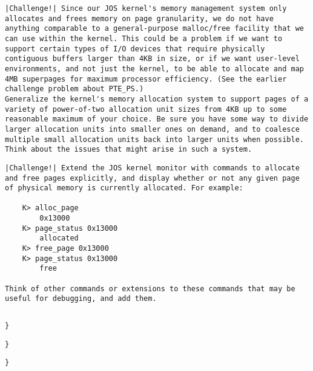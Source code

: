 \documentclass{article}
\begin{document}
\begin{CJK*}{UTF8}{gkai}
\begin{lstlisting}[style=challenge]
|Challenge!| Since our JOS kernel's memory management system only allocates and frees memory on page granularity, we do not have anything comparable to a general-purpose malloc/free facility that we can use within the kernel. This could be a problem if we want to support certain types of I/O devices that require physically contiguous buffers larger than 4KB in size, or if we want user-level environments, and not just the kernel, to be able to allocate and map 4MB superpages for maximum processor efficiency. (See the earlier challenge problem about PTE_PS.)
Generalize the kernel's memory allocation system to support pages of a variety of power-of-two allocation unit sizes from 4KB up to some reasonable maximum of your choice. Be sure you have some way to divide larger allocation units into smaller ones on demand, and to coalesce multiple small allocation units back into larger units when possible. Think about the issues that might arise in such a system.
\end{lstlisting}

\begin{lstlisting}[style=challenge]
|Challenge!| Extend the JOS kernel monitor with commands to allocate and free pages explicitly, and display whether or not any given page of physical memory is currently allocated. For example:

	K> alloc_page
		0x13000
	K> page_status 0x13000
		allocated
	K> free_page 0x13000
	K> page_status 0x13000
		free
	
Think of other commands or extensions to these commands that may be useful for debugging, and add them.
\end{lstlisting}

\begin{lstlisting}[style=ccode, title={\scriptsize \ttfamily \bfseries kern/pmap.c: i386\_vm\_init ()}]

\end{lstlisting}


\begin{lstlisting}[style=ccode, title={\scriptsize \ttfamily \bfseries kern/pmap.c: i386\_vm\_init ()}]
}
\end{lstlisting}

\begin{lstlisting}[style=ccode, title={\scriptsize \ttfamily \bfseries kern/pmap.c: i386\_vm\_init ()}]
}
\end{lstlisting}

\begin{lstlisting}[style=ccode, title={\scriptsize \ttfamily \bfseries kern/pmap.c: i386\_vm\_init ()}]
}
\end{lstlisting}

\begin{lstlisting}[style=console]
\end{lstlisting}

\begin{lstlisting}[style=console]
\end{lstlisting}


\clearpage

\end{CJK*}
\end{document}
